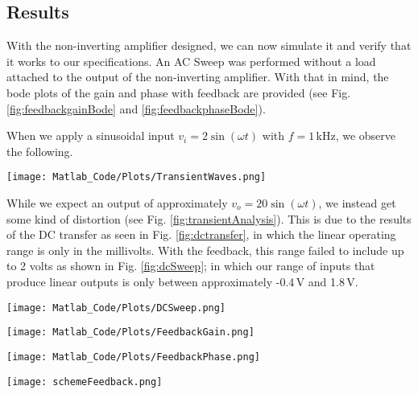 \documentclass[lettersize,journal]{IEEEtran}
\begin{document}
\subsection{Results}
With the non-inverting amplifier designed, we can now simulate it 
and verify that it works to our specifications. An AC Sweep was 
performed without a load attached to the output of the non-inverting amplifier.
With that in mind, the bode plots of the gain and phase with feedback are provided
(see Fig. \ref{fig:feedbackgainBode} and \ref{fig:feedbackphaseBode}).

When we apply a sinusoidal input $v_i = 2\sin(\omega t)$ with $f = 1\,$kHz, 
we observe the following.
\begin{figure*}[!t]
  \centering
  \texttt{[image: Matlab\_Code/Plots/TransientWaves.png]}
  \caption{Transient Analysis}
  \label{fig:transientAnalysis}
\end{figure*}
While we expect an output of approximately $v_o = 20\sin(\omega t)$, we instead 
get some kind of distortion (see Fig. \ref{fig:transientAnalysis}). This is due to the results of the DC transfer 
as seen in Fig. \ref{fig:dctransfer}, in which the linear operating range is 
only in the millivolts. With the feedback, this range failed to include 
up to 2 volts as shown in Fig. \ref{fig:dcSweep}; in which our range 
of inputs that produce linear outputs is only between approximately -0.4$\,$V 
and 1.8$\,$V.

\begin{figure*}[!t]
  \centering
  \texttt{[image: Matlab\_Code/Plots/DCSweep.png]}
  \caption{DC Sweep for Non-Inverting Amplifier}
  \label{fig:dcSweep}
\end{figure*}

\IEEEpubidadjcol

\begin{figure*}[!t]
  \centering
  \texttt{[image: Matlab\_Code/Plots/FeedbackGain.png]}
  \caption{Bode Plot of Non-Inverting Amplifier Gain}
  \label{fig:feedbackgainBode}
\end{figure*}

\begin{figure*}[!t]
  \centering
  \texttt{[image: Matlab\_Code/Plots/FeedbackPhase.png]}
  \caption{Bode Plot of Non-Inverting Amplifier Phase} 
  \label{fig:feedbackphaseBode}
  \hrulefill
\end{figure*}

\begin{figure*}[!t]
  \centering
  \texttt{[image: schemeFeedback.png]}
  \caption{Non-Inverting Op-Amp Schematic}
  \label{fig:feedbackScheme}
\end{figure*}
\end{document}
